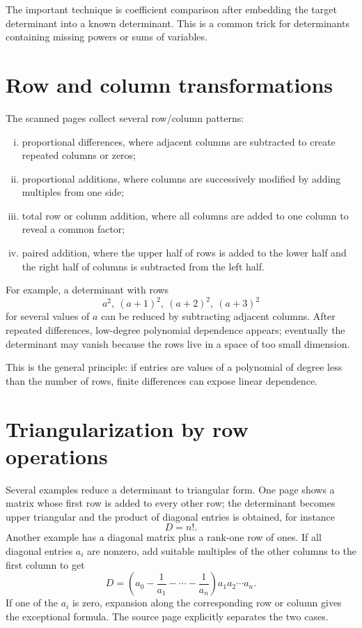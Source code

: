The important technique is coefficient comparison after embedding the target determinant into a known determinant.  This is a common trick for determinants containing missing powers or sums of variables.

\section{Row and column transformations}

The scanned pages collect several row/column patterns:

\begin{enumerate}[(i)]
  \item proportional differences, where adjacent columns are subtracted to create repeated columns or zeros;
  \item proportional additions, where columns are successively modified by adding multiples from one side;
  \item total row or column addition, where all columns are added to one column to reveal a common factor;
  \item paired addition, where the upper half of rows is added to the lower half and the right half of columns is subtracted from the left half.
\end{enumerate}

For example, a determinant with rows
\[
  a^2,\ (a+1)^2,\ (a+2)^2,\ (a+3)^2
\]
for several values of $a$ can be reduced by subtracting adjacent columns.  After repeated differences, low-degree polynomial dependence appears; eventually the determinant may vanish because the rows live in a space of too small dimension.

This is the general principle: if entries are values of a polynomial of degree less than the number of rows, finite differences can expose linear dependence.

\section{Triangularization by row operations}

Several examples reduce a determinant to triangular form.  One page shows a matrix whose first row is added to every other row; the determinant becomes upper triangular and the product of diagonal entries is obtained, for instance
\[
  D=n!.
\]
Another example has a diagonal matrix plus a rank-one row of ones.  If all diagonal entries $a_i$ are nonzero, add suitable multiples of the other columns to the first column to get
\[
  D=\left(a_0-\frac1{a_1}-\cdots-\frac1{a_n}\right)a_1a_2\cdots a_n.
\]
If one of the $a_i$ is zero, expansion along the corresponding row or column gives the exceptional formula.  The source page explicitly separates the two cases.

